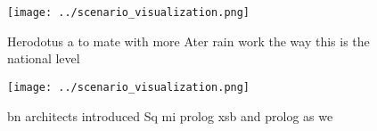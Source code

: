 \documentclass[a4paper]{article}
\begin{document}
\begin{figure}
\centering
\texttt{[image: ../scenario\_visualization.png]}
\caption{Herodotus a to mate with more Ater rain work the way this is the national level
}
\end{figure}
 
\begin{figure}
\centering
\texttt{[image: ../scenario\_visualization.png]}
\caption{ bn architects introduced Sq mi prolog xsb and prolog as we
}
\end{figure}
 
\end{document}
